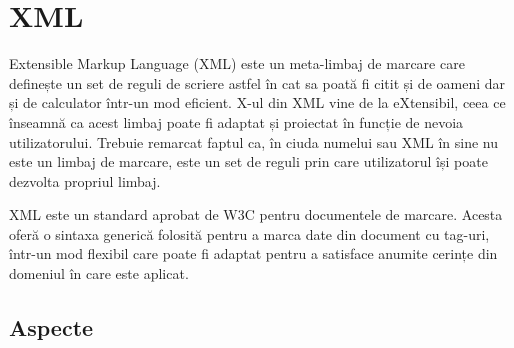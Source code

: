 \newpage
\section{XML}

Extensible Markup Language (XML) este un meta-limbaj de marcare care definește un set de reguli de scriere astfel în cat sa poată fi citit și de oameni dar și de calculator într-un mod eficient. X-ul din XML vine de la eXtensibil, ceea ce înseamnă ca acest limbaj poate fi adaptat și proiectat în funcție de nevoia utilizatorului. Trebuie remarcat faptul ca, în ciuda numelui sau XML în sine nu este un limbaj de marcare, este un set de reguli prin care utilizatorul își poate dezvolta propriul limbaj.

XML este un standard aprobat de W3C pentru documentele de marcare. Acesta oferă o
sintaxa generică folosită pentru a marca date din document cu tag-uri, într-un mod flexibil care poate fi adaptat pentru a satisface anumite cerințe din domeniul în care este aplicat.

\subsection{Aspecte}

